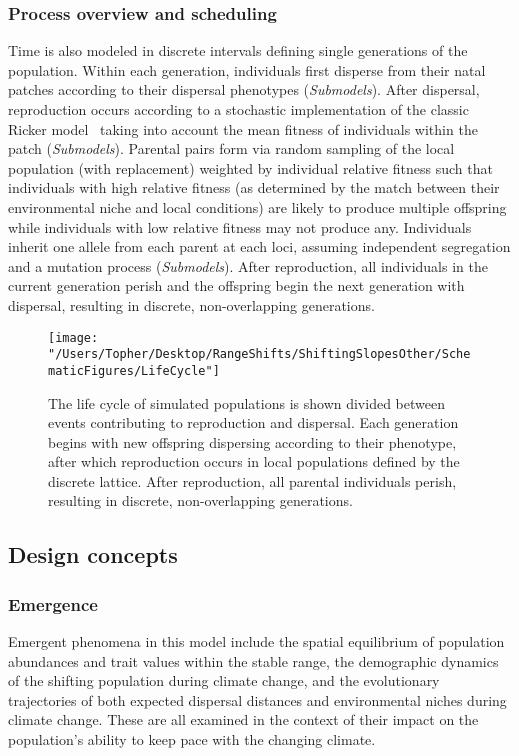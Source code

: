\documentclass[11pt, oneside]{article}
\begin{document}
\subsubsection{Process overview and scheduling}
Time is also modeled in discrete intervals defining single generations of the population. Within each generation, individuals first disperse from their natal patches according to their dispersal phenotypes (\textit{Submodels}). After dispersal, reproduction occurs according to a stochastic implementation of the classic Ricker model~\citep{ricker1954stock} taking into account the mean fitness of individuals within the patch (\textit{Submodels}). Parental pairs form via random sampling of the local population (with replacement) weighted by individual relative fitness such that individuals with high relative fitness (as determined by the match between their environmental niche and local conditions) are likely to produce multiple offspring while individuals with low relative fitness may not produce any. Individuals inherit one allele from each parent at each loci, assuming independent segregation and a mutation process (\textit{Submodels}). After reproduction, all individuals in the current generation perish and the offspring begin the next generation with dispersal, resulting in discrete, non-overlapping generations. 

\begin{figure}
\centering
\texttt{[image: "/Users/Topher/Desktop/RangeShifts/ShiftingSlopesOther/SchematicFigures/LifeCycle"]}
\vspace{-5mm}
\caption[LoF entry]{The life cycle of simulated populations is shown divided between events contributing to reproduction and dispersal. Each generation begins with new offspring dispersing according to their phenotype, after which reproduction occurs in local populations defined by the discrete lattice. After reproduction, all parental individuals perish, resulting in discrete, non-overlapping generations.}
\label{fig:LifeCycle}
\end{figure}

\subsection{Design concepts}
\subsubsection{Emergence}
Emergent phenomena in this model include the spatial equilibrium of population abundances and trait values within the stable range, the demographic dynamics of the shifting population during climate change, and the evolutionary trajectories of both expected dispersal distances and environmental niches during climate change. These are all examined in the context of their impact on the population's ability to keep pace with the changing climate.  
\end{document}
